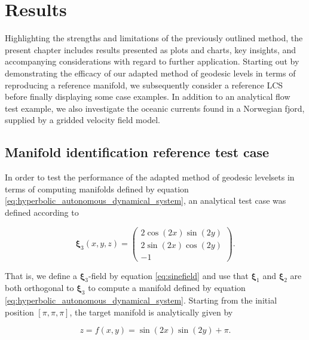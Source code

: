\chapter[Results]{Results}\label{ch:Results}

Highlighting the strengths and limitations of the previously outlined method, the present chapter includes results presented as plots and charts, key insights, and accompanying considerations with regard to further application. Starting out by demonstrating the efficacy of our adapted method of geodesic levels in terms of reproducing a reference manifold, we subsequently consider a reference LCS before finally displaying some case examples. In addition to an analytical flow test example, we also investigate the oceanic currents found in a Norwegian fjord, supplied by a gridded velocity field model.

\section{Manifold identification reference test case}\label{sec:GLS_test_cases}

In order to test the performance of the adapted method of geodesic levelsets in terms of computing manifolds defined by equation \eqref{eq:hyperbolic_autonomous_dynamical_system}, an analytical test case was defined according to

\begin{equation}\label{eq:sinefield}
\bm{\xi}_3(x,y,z) = \begin{pmatrix}
2\cos(2x)\sin(2y)\\
2\sin(2x)\cos(2y)\\
-1
\end{pmatrix}.
\end{equation}

\noindent That is, we define a $\bm{\xi}_3$-field by equation \eqref{eq:sinefield} and use that $\bm{\xi}_1$ and $\bm{\xi}_2$ are both orthogonal to $\bm{\xi}_3$ to compute a manifold defined by equation \eqref{eq:hyperbolic_autonomous_dynamical_system}. Starting from the initial position $[\pi,\pi,\pi]$, the target manifold is analytically given by 

\begin{equation}\label{eq:sine_manifold}
z = f(x,y) = \sin(2x)\sin(2y) + \pi.
\end{equation}

